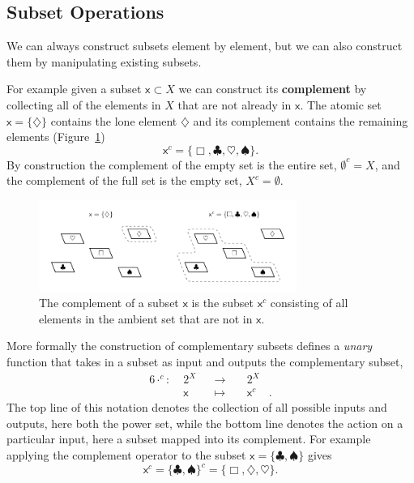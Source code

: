 \documentclass[
  letterpaper,
  DIV=11,
  numbers=noendperiod]{scrartcl}
\begin{document}
\hypertarget{subset-operations}{%
\subsection{Subset Operations}\label{subset-operations}}

We can always construct subsets element by element, but we can also
construct them by manipulating existing subsets.

For example given a subset \(\mathsf{x} \subset X\) we can construct its
\textbf{complement} by collecting all of the elements in \(X\) that are
not already in \(\mathsf{x}\). The atomic set
\(\mathsf{x} = \{ \diamondsuit \}\) contains the lone element
\(\diamondsuit\) and its complement contains the remaining elements
(Figure~\ref{fig-complement}) \[
\mathsf{x}^{c} = \{ \Box, \clubsuit, \heartsuit, \spadesuit \}.
\] By construction the complement of the empty set is the entire set,
\(\emptyset^{c} = X\), and the complement of the full set is the empty
set, \(X^{c} = \emptyset\).

\begin{figure}

{\centering \includegraphics[width=0.75\textwidth,height=\textheight]{figures/complement/complement.pdf}

}

\caption{\label{fig-complement}The complement of a subset \(\mathsf{x}\)
is the subset \(\mathsf{x}^{c}\) consisting of all elements in the
ambient set that are not in \(\mathsf{x}\).}

\end{figure}

More formally the construction of complementary subsets defines a
\emph{unary} function that takes in a subset as input and outputs the
complementary subset, \begin{alignat*}{6}
\cdot^c :\; & 2^X & &\rightarrow& \; & 2^X &
\\
& \mathsf{x} & &\mapsto& & \mathsf{x}^{c} &.
\end{alignat*} The top line of this notation denotes the collection of
all possible inputs and outputs, here both the power set, while the
bottom line denotes the action on a particular input, here a subset
mapped into its complement. For example applying the complement operator
to the subset \(\mathsf{x} = \{ \clubsuit, \spadesuit \}\) gives \[
\mathsf{x}^{c}
= \{ \clubsuit, \spadesuit \}^{c}
= \{ \Box, \diamondsuit, \heartsuit \}.
\]
\end{document}
